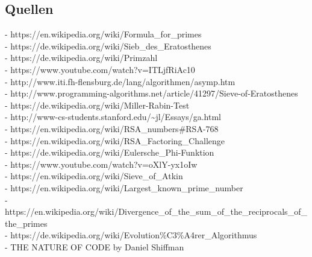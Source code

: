 \documentclass[a4paper,12pt]{article}
\begin{document}
\begin{appendix}
\section{Quellen}
- https://en.wikipedia.org/wiki/Formula\_for\_primes\\
- https://de.wikipedia.org/wiki/Sieb\_des\_Eratosthenes\\
- https://de.wikipedia.org/wiki/Primzahl\\
- https://www.youtube.com/watch?v=ITLjfRiAc10\\
- http://www.iti.fh-flensburg.de/lang/algorithmen/asymp.htm\\
- http://www.programming-algorithms.net/article/41297/Sieve-of-Eratosthenes\\
- https://de.wikipedia.org/wiki/Miller-Rabin-Test\\
- http://www-cs-students.stanford.edu/\textasciitilde jl/Essays/ga.html\\
- https://en.wikipedia.org/wiki/RSA\_numbers\#RSA-768\\
- https://en.wikipedia.org/wiki/RSA\_Factoring\_Challenge\\
- https://de.wikipedia.org/wiki/Eulersche\_Phi-Funktion\\
- https://www.youtube.com/watch?v=oXlY-yx1oIw\\
- https://en.wikipedia.org/wiki/Sieve\_of\_Atkin\\
- https://en.wikipedia.org/wiki/Largest\_known\_prime\_number\\
- https://en.wikipedia.org/wiki/Divergence\_of\_the\_sum\_of\_the\_reciprocals\_of\_the\_primes\\
- https://de.wikipedia.org/wiki/Evolution\%C3\%A4rer\_Algorithmus\\
- THE NATURE OF CODE by Daniel Shiffman\\
\end{appendix}
\end{document}

